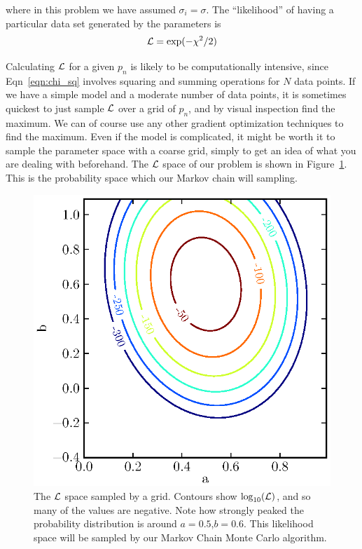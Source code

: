 \documentclass[iop,floatfix]{emulateapj}
\begin{document}
where in this problem we have assumed $\sigma_i = \sigma$. The ``likelihood'' of having a particular data set generated by the parameters is 
\begin{equation}
  {\cal L} = \exp(-\chi^2/2)
  \label{eqn:likelihood}
\end{equation}

Calculating ${\cal L}$ for a given $p_n$ is likely to be computationally intensive, since Eqn~\ref{eqn:chi_sq} involves squaring and summing operations for $N$ data points. If we have a simple model and a moderate number of data points, it is sometimes quickest to just sample ${\cal L}$ over a grid of $p_n$, and by visual inspection find the maximum. We can of course use any other gradient optimization techniques to find the maximum. Even if the model is complicated, it might be worth it to sample the parameter space with a coarse grid, simply to get an idea of what you are dealing with beforehand. The ${\cal L}$ space of our problem is shown in Figure~\ref{fig:likelihood}. This is the probability space which our Markov chain will sampling.

\begin{figure}
\begin{center}
  \includegraphics{likelihood}
  \caption{The ${\cal L}$ space sampled by a grid. Contours show $\log_{10}({\cal L})$, and so many of the values are negative. Note how strongly peaked the probability distribution is around $a=0.5$,$b=0.6$. This likelihood space will be sampled by our Markov Chain Monte Carlo algorithm.}
\label{fig:likelihood}
\end{center}
\end{figure}
\end{document}
